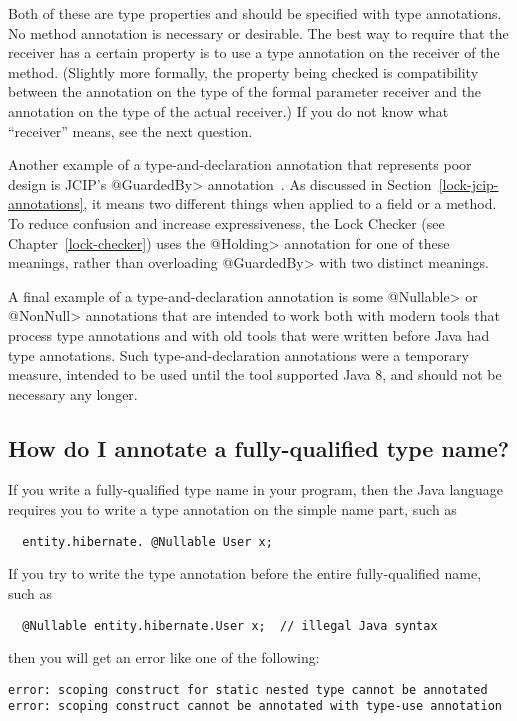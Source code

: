 Both of these are type properties and should be specified with type
annotations.  No method annotation is necessary or desirable.  The best way
to require that the receiver has a certain property is to use a type
annotation on the receiver of the method.  (Slightly more formally, the
property being checked is compatibility between the annotation on the type
of the formal parameter receiver and the annotation on the type of the
actual receiver.)  If you do not know what ``receiver'' means, see the next
question.


Another example of a type-and-declaration annotation that represents poor
design is JCIP's \<@GuardedBy> annotation~\cite{Goetz2006}.  As discussed
in Section~\ref{lock-jcip-annotations}, it means two different things when
applied to a field or a method.  To reduce confusion and increase
expressiveness, the Lock Checker (see Chapter~\ref{lock-checker}) uses the
\<@Holding> annotation for one of these meanings, rather than overloading
\<@GuardedBy> with two distinct meanings.


A final example of a type-and-declaration annotation is some \<@Nullable>
or \<@NonNull> annotations that are intended to work both with modern tools
that process type annotations and with old tools that were written before
Java had type annotations.  Such type-and-declaration annotations were a
temporary measure, intended to be used until the tool supported Java 8, and
should not be necessary any longer.


\subsection{How do I annotate a fully-qualified type name?\label{faq-annotate-fully-qualified-name}}

If you write a fully-qualified type name in your program, then the Java
language requires you to write a type annotation on the simple name part,
such as
\begin{Verbatim}
  entity.hibernate. @Nullable User x;
\end{Verbatim}

If you try to write the type annotation before the entire fully-qualified
name, such as
\begin{Verbatim}
  @Nullable entity.hibernate.User x;  // illegal Java syntax
\end{Verbatim}
\noindent
then you will get an error like one of the following:
\begin{Verbatim}
error: scoping construct for static nested type cannot be annotated
error: scoping construct cannot be annotated with type-use annotation
\end{Verbatim}



